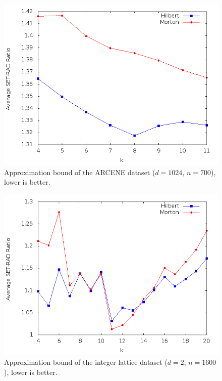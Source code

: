 \documentclass[10pt]{article}
\begin{document}
\begin{figure}
\begin{center}
\includegraphics[scale=0.5]{ArcGra2.png}
\caption{Approximation bound of the ARCENE dataset ($d = 1024$, $n = 700$), lower is better.}
\label{approx-acrene}
\end{center}
\end{figure}

\begin{figure}
\begin{center}
\includegraphics[scale=0.5]{LatGra2.png}
\caption{Approximation bound of the integer lattice dataset ($d = 2$, $n = 1600$), lower is better.}
\label{approx-lattice}
\end{center}
\end{figure}



\end{document}
